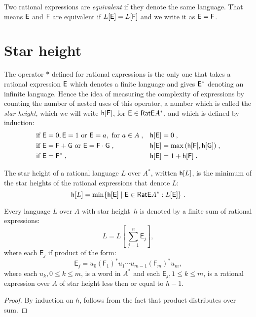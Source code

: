 Two rational expressions are \emph{equivalent} if they denote the same language. That means ${\mathsf{E}}$ and ${\mathsf{F}}$ are equivalent if $L[{\mathsf{E}}] = L[{\mathsf{F}}]$ and we write it as ${\mathsf{E}} = {\mathsf{F}}$.

\section{Star height}

The operator $*$ defined for rational expressions is the only one that takes a rational expression ${\mathsf{E}}$ which denotes a finite language and gives ${\mathsf{E^*}}$ denoting an infinite language.  Hence the idea of measuring the complexity of expressions by counting the number of nested uses of this operator, a number which is called the \emph{star height}, which we will write ${\mathsf{h}[{\mathsf{E}}]}$, for ${\mathsf{E}} \in {\mathsf{RatE}} A^*$, and which is defined by induction:
\begin{align*}
    &\text{if } {\mathsf{E}} = 0, {\mathsf{E}} = 1 \text{ or } {\mathsf{E}} = a, \text{ for } a \in A \; , & &{\mathsf{h}[{\mathsf{E}}]} = 0 \; , \\
    &\text{if } {\mathsf{E}} = {\mathsf{F}} + {\mathsf{G}} \text{ or } {\mathsf{E}} = {\mathsf{F}} \cdot {\mathsf{G}}\; , & &{\mathsf{h}[{\mathsf{E}}]} = \max{({\mathsf{h}[{\mathsf{F}}]}, {\mathsf{h}[{\mathsf{G}}]})} \; , \\
    &\text{if } {\mathsf{E}} = {\mathsf{F}}^* \; , & &{\mathsf{h}[{\mathsf{E}}]} = 1 + {\mathsf{h}[{\mathsf{F}}]} \; .
\end{align*}

The star height of a rational language $L$ over $A^*$, written ${\mathsf{h}[L]}$, is the minimum of the star heights of the rational expressions that denote $L$:
\[
    {\mathsf{h}[L]} = \min \{ {\mathsf{h}[{\mathsf{E}}]} \mid {\mathsf{E}} \in {\mathsf{RatE}} A^*: L[{\mathsf{E}}] \} \; .
\]

\begin{lemma}\label{lm:star_height_distributivity}
    Every language $L$ over $A$ with star height~$h$ is denoted by a finite sum of rational expressions:
    \[
        L = L \left[ \, \sum_{j=1}^n \mathsf{E}_j \right] ,
    \]
    where each $\mathsf{E}_j$ if product of the form:
    \[
        \mathsf{E}_j = u_0{(\mathsf{F}_1)}^*u_1 \dotsm u_{m-1}{(\mathsf{F}_m)}^*u_m,
    \]
    where each $u_k, 0 \leq k \leq m$, is a word in $A^*$ and each $\mathsf{E}_j, 1 \leq k \leq m$, is a rational expression over $A$ of star height less then or equal to $h-1$.
\end{lemma}

\begin{proof}
    By induction on $h$, follows from the fact that product distributes over sum. 
\end{proof}

